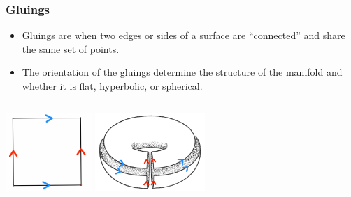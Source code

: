 \documentclass[13pt]{beamer}
\begin{document}
\begin{frame}
\frametitle{Gluings}
	\begin{itemize}
    \item \alert{Gluings} are when two edges or sides of a surface are ``connected'' and share the same set of points.
		\item The orientation of the gluings determine the structure of the manifold and whether it is flat, hyperbolic, or spherical.
	\end{itemize}

  \begin{columns}[r] %
     \centering
      \includegraphics[height=3cm]{./img/torusgluing}
     \centering
     \includegraphics[height=3cm]{./img/torusconstruction}
  \end{columns}
\end{frame}
\end{document}
